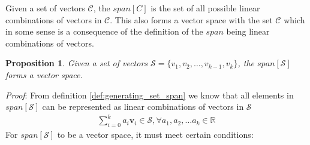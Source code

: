 \documentclass[a4paper,12pt]{article}
\newcommand{\set}[1]{\mathcal{#1}}
\newcommand{\vectr}[1]{\textbf{#1}}
\newcommand{\real}{\mathbb{R}}
\newcommand{\italic}[1]{\textit{#1}}
\newcommand{\lcomb}[1]{\sum_{i = 0}^{k} {#1} \vectr{v}_i}
\newtheorem{proposition}{Proposition}[section]
\begin{document}
	Given a set of vectors $ \set{C} $, the $span[C]$ is the set of all possible linear combinations of vectors in $ \set{C} $. This also forms a vector space with the set $ \set{C} $ which in some sense is a consequence of the definition of the $ span $ being linear combinations of vectors. 
	
	\begin{proposition}
		\normalfont Given a set of vectors $ \set{S} = \{v_1, v_2, \ldots, v_{k - 1}, v_k\} $, the $ span[\set{S}] $ forms a vector space.
		\label{prop:span_is_vector_space}
	\end{proposition}
	\italic{Proof}: From definition \ref{def:generating_set_span} we know that all elements in $ span[\set{S}] $ can be represented as linear combinations of vectors in $ \set{S} $
	\begin{align}
		\lcomb{a_i} \in \set{S}, \forall a_1, a_2, \ldots a_k \in \real
	\end{align}
	For $ span[\set{S}] $ to be a vector space, it must meet certain conditions:
\end{document}
